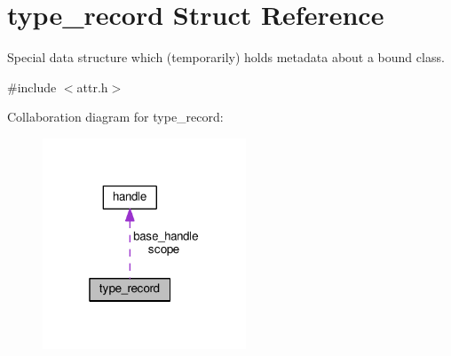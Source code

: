 \hypertarget{structtype__record}{}\section{type\+\_\+record Struct Reference}
\label{structtype__record}


Special data structure which (temporarily) holds metadata about a bound class.  




{\ttfamily \#include $<$attr.\+h$>$}



Collaboration diagram for type\+\_\+record\+:
\nopagebreak
\begin{figure}[H]
\begin{center}
\leavevmode
\includegraphics[width=172pt]{structtype__record__coll__graph}
\end{center}
\end{figure}
